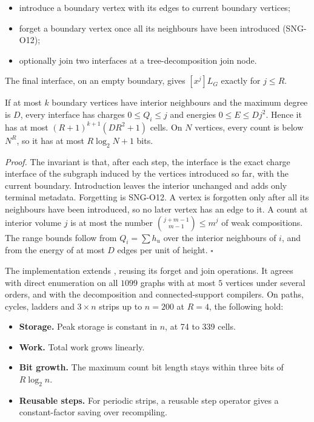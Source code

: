 \documentclass[
  11pt,
  a4paper,
]{report}
\providecommand{\tightlist}{%
  \setlength{\itemsep}{0pt}\setlength{\parskip}{0pt}}
\let\singularitytexttt\texttt
\renewcommand{\texttt}[1]{\singularitytexttt{\seqsplit{#1}}}
\begin{document}
\begin{itemize}
\tightlist
\item
  introduce a boundary vertex with its edges to current boundary
  vertices;
\item
  forget a boundary vertex once all its neighbours have been introduced
  (SNG-O12);
\item
  optionally join two interfaces at a tree-decomposition join node.
\end{itemize}

The final interface, on an empty boundary, gives \([x^j]L_G\) exactly
for \(j\le R\).

If at most \(k\) boundary vertices have interior neighbours and the
maximum degree is \(D\), every interface has charges \(0\le Q_i\le j\)
and energies \(0\le E\le Dj^2\). Hence it has at most
\((R+1)^{k+1}(DR^2+1)\) cells. On \(N\) vertices, every count is below
\(N^R\), so it has at most \(R\log_2N+1\) bits.

\emph{Proof.} The invariant is that, after each step, the interface is
the exact charge interface of the subgraph induced by the vertices
introduced so far, with the current boundary. Introduction leaves the
interior unchanged and adds only terminal metadata. Forgetting is
SNG-O12. A vertex is forgotten only after all its neighbours have been
introduced, so no later vertex has an edge to it. A count at interior
volume \(j\) is at most the number \(\binom{j+m-1}{m-1}\le m^j\) of weak
compositions. The range bounds follow from \(Q_i=\sum h_u\) over the
interior neighbours of \(i\), and from the energy of at most \(D\) edges
per unit of height. \(\square\)

The implementation \texttt{separator\_compiler.py} extends
\texttt{charges.py}, reusing its forget and join operations. It agrees
with direct enumeration on all \(1099\) graphs with at most \(5\)
vertices under several orders, and with the decomposition and
connected-support compilers. On paths, cycles, ladders and \(3\times n\)
strips up to \(n=200\) at \(R=4\), the following hold:

\begin{itemize}
\tightlist
\item
  \textbf{Storage.} Peak storage is constant in \(n\), at 74 to 339
  cells.
\item
  \textbf{Work.} Total work grows linearly.
\item
  \textbf{Bit growth.} The maximum count bit length stays within three
  bits of \(R\log_2n\).
\item
  \textbf{Reusable steps.} For periodic strips, a reusable step operator
  gives a constant-factor saving over recompiling.
\end{itemize}
\end{document}
